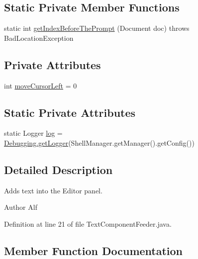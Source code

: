 \subsection*{Static Private Member Functions}
\begin{DoxyCompactItemize}
\item 
static int \hyperlink{classgov_1_1nasa_1_1jpf_1_1inspector_1_1frontends_1_1jpfshell_1_1gui_1_1_text_component_feeder_a122cf261ba3298a3166351cb1b14fb05}{get\+Index\+Before\+The\+Prompt} (Document doc)  throws Bad\+Location\+Exception 
\end{DoxyCompactItemize}
\subsection*{Private Attributes}
\begin{DoxyCompactItemize}
\item 
int \hyperlink{classgov_1_1nasa_1_1jpf_1_1inspector_1_1frontends_1_1jpfshell_1_1gui_1_1_text_component_feeder_ae2835ec22871ca52247fb80fbdfd95c0}{move\+Cursor\+Left} = 0
\end{DoxyCompactItemize}
\subsection*{Static Private Attributes}
\begin{DoxyCompactItemize}
\item 
static Logger \hyperlink{classgov_1_1nasa_1_1jpf_1_1inspector_1_1frontends_1_1jpfshell_1_1gui_1_1_text_component_feeder_abd9a7fdd560d87f20caa912ed849ef72}{log} = \hyperlink{classgov_1_1nasa_1_1jpf_1_1inspector_1_1utils_1_1_debugging_a06cdc92a97816ad85793b034bfd5822a}{Debugging.\+get\+Logger}(Shell\+Manager.\+get\+Manager().get\+Config())
\end{DoxyCompactItemize}


\subsection{Detailed Description}
Adds text into the Editor panel. 

\begin{DoxyAuthor}{Author}
Alf 
\end{DoxyAuthor}


Definition at line 21 of file Text\+Component\+Feeder.\+java.



\subsection{Member Function Documentation}
